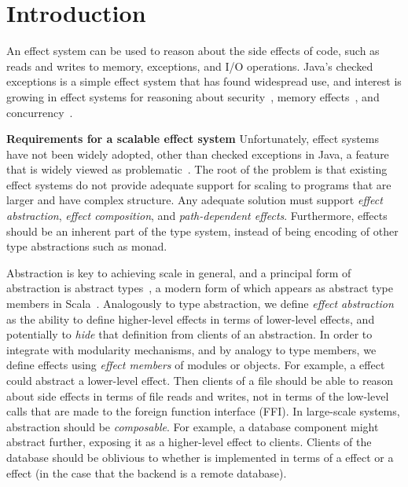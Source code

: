 \chapter{Introduction}

An effect system can be used to reason about the side effects of code, such as reads and writes to memory, exceptions, and I/O operations.  Java's checked exceptions is a simple effect system that has found widespread use, and interest is growing in effect systems for reasoning about security~\cite{turbak08}, memory effects~\cite{lucassen88}, and concurrency~\cite{bocchino09,bracevac18,dolan17}.

\noindent\textbf{Requirements for a scalable effect system} Unfortunately, effect systems have not been widely adopted, other than checked exceptions in Java, a feature that is widely viewed as problematic~\cite{10.1145/1103845.1094847}.  The root of the problem is that existing effect systems do not provide adequate support for scaling to programs that are larger and have complex structure.  Any adequate solution must support \textit{effect abstraction}, \textit{effect composition}, and \textit{path-dependent effects}. Furthermore, effects should be an inherent part of the type system, instead of being encoding of other type abstractions such as monad.

Abstraction is key to achieving scale in general, and a principal form of abstraction is abstract types~\cite{10.1145/44501.45065}, a modern form of which appears as abstract type members in Scala~\cite{odersky05}. Analogously to type abstraction, we define \textit{effect abstraction} as the ability to define higher-level effects in terms of lower-level effects, and potentially to \textit{hide} that definition from clients of an abstraction.  In order to integrate with modularity mechanisms, and by analogy to type members, we define effects using \textit{effect members} of modules or objects.  For example, a  effect could abstract a lower-level  effect. Then clients of a file should be able to reason about side effects in terms of file reads and writes, not in terms of the low-level calls that are made to the foreign function interface (FFI).  In large-scale systems, abstraction should be \textit{composable}.  For example, a database component might abstract  further, exposing it as a higher-level  effect to clients.  Clients of the database should be oblivious to whether  is implemented in terms of a  effect or a  effect (in the case that the backend is a remote database).

